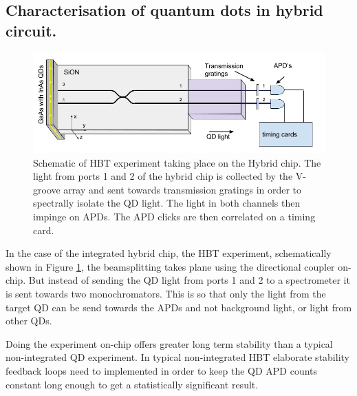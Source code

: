 \subsection{Characterisation of quantum dots in hybrid circuit.}

\begin{figure}[h!] \begin{center}
\includegraphics[width=1\textwidth]{images/hyb_hbt.png} \caption{
Schematic of HBT experiment taking place on the Hybrid chip. The light from
ports 1 and 2 of the hybrid chip is collected by the V-groove array and sent
towards transmission gratings in order to spectrally isolate the QD light.  The
light in both channels then impinge on APDs. The APD clicks are then correlated
on a timing card.
} \label{fig:hyb_basic_hbt}\end{center} \end{figure}

In the case of the integrated hybrid chip, the HBT experiment, schematically shown in Figure
\ref{fig:hyb_basic_hbt}, the beamsplitting takes plane using the directional
coupler on-chip. But instead of sending the QD light from ports 1 and 2 to a
spectrometer it is sent towards two monochromators. This is so that only the
light from the target QD can be send towards the APDs and not background light,
or light from other QDs.

Doing the experiment on-chip offers greater long term stability than a typical non-integrated QD
experiment. In typical non-integrated HBT elaborate stability feedback loops
need to implemented in order to keep the QD APD counts constant long enough to
get a statistically significant result.
